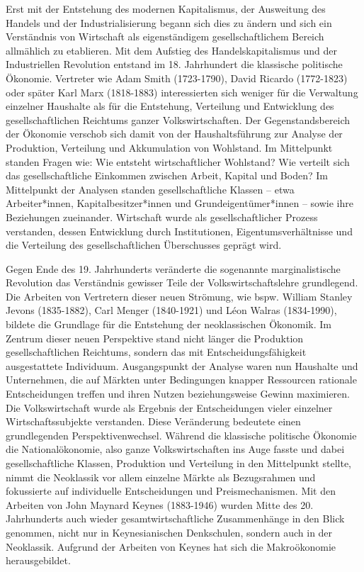 \documentclass[
  nswissgerman,
  a4paper,
  DIV=11,
  numbers=noendperiod,
  oneside,
  openany]{scrreprt}
\begin{document}
Erst mit der Entstehung des modernen Kapitalismus, der Ausweitung des
Handels und der Industrialisierung begann sich dies zu ändern und sich
ein Verständnis von Wirtschaft als eigenständigem gesellschaftlichem
Bereich allmählich zu etablieren. Mit dem Aufstieg des
Handelskapitalismus und der Industriellen Revolution entstand im 18.
Jahrhundert die klassische politische Ökonomie. Vertreter wie Adam Smith
(1723-1790), David Ricardo (1772-1823) oder später Karl Marx (1818-1883)
interessierten sich weniger für die Verwaltung einzelner Haushalte als
für die Entstehung, Verteilung und Entwicklung des gesellschaftlichen
Reichtums ganzer Volkswirtschaften. Der Gegenstandsbereich der Ökonomie
verschob sich damit von der Haushaltsführung zur Analyse der Produktion,
Verteilung und Akkumulation von Wohlstand. Im Mittelpunkt standen Fragen
wie: Wie entsteht wirtschaftlicher Wohlstand? Wie verteilt sich das
gesellschaftliche Einkommen zwischen Arbeit, Kapital und Boden? Im
Mittelpunkt der Analysen standen gesellschaftliche Klassen -- etwa
Arbeiter*innen, Kapitalbesitzer*innen und Grundeigentümer*innen -- sowie
ihre Beziehungen zueinander. Wirtschaft wurde als gesellschaftlicher
Prozess verstanden, dessen Entwicklung durch Institutionen,
Eigentumsverhältnisse und die Verteilung des gesellschaftlichen
Überschusses geprägt wird.

Gegen Ende des 19. Jahrhunderts veränderte die sogenannte
marginalistische Revolution das Verständnis gewisser Teile der
Volkswirtschaftslehre grundlegend. Die Arbeiten von Vertretern dieser
neuen Strömung, wie bspw. William Stanley Jevons (1835-1882), Carl
Menger (1840-1921) und Léon Walras (1834-1990), bildete die Grundlage
für die Entstehung der neoklassischen Ökonomik. Im Zentrum dieser neuen
Perspektive stand nicht länger die Produktion gesellschaftlichen
Reichtums, sondern das mit Entscheidungsfähigkeit ausgestattete
Individuum. Ausgangspunkt der Analyse waren nun Haushalte und
Unternehmen, die auf Märkten unter Bedingungen knapper Ressourcen
rationale Entscheidungen treffen und ihren Nutzen beziehungsweise Gewinn
maximieren. Die Volkswirtschaft wurde als Ergebnis der Entscheidungen
vieler einzelner Wirtschaftssubjekte verstanden. Diese Veränderung
bedeutete einen grundlegenden Perspektivenwechsel. Während die
klassische politische Ökonomie die Nationalökonomie, also ganze
Volkswirtschaften ins Auge fasste und dabei gesellschaftliche Klassen,
Produktion und Verteilung in den Mittelpunkt stellte, nimmt die
Neoklassik vor allem einzelne Märkte als Bezugsrahmen und fokussierte
auf individuelle Entscheidungen und Preismechanismen. Mit den Arbeiten
von John Maynard Keynes (1883-1946) wurden Mitte des 20. Jahrhunderts
auch wieder gesamtwirtschaftliche Zusammenhänge in den Blick genommen,
nicht nur in Keynesianischen Denkschulen, sondern auch in der
Neoklassik. Aufgrund der Arbeiten von Keynes hat sich die Makroökonomie
herausgebildet.
\end{document}
